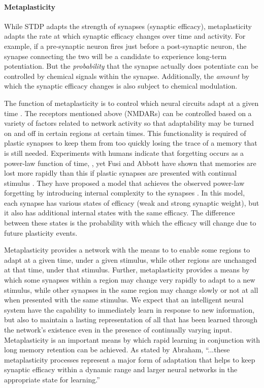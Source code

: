 \documentclass[twocolumn]{article}
\begin{document}
\paragraph{Metaplasticity}
While STDP adapts the strength of synapses (synaptic efficacy), metaplasticity adapts the rate at which synaptic efficacy changes over time and activity. For example, if a pre-synaptic neuron fires just before a post-synaptic neuron, the synapse connecting the two will be a candidate to experience long-term potentiation. But the \textit{probability} that the synapse actually does potentiate can be controlled by chemical signals within the synapse. Additionally, the \textit{amount} by which the synaptic efficacy changes is also subject to chemical modulation. 

The function of metaplasticity is to control which neural circuits adapt at a given time \cite{ab2008}. The receptors mentioned above (NMDARs) can be controlled based on a variety of factors related to network activity so that adaptability may be turned on and off in certain regions at certain times. This functionality is required of plastic synapses to keep them from too quickly losing the trace of a memory that is still needed. Experiments with humans indicate that forgetting occurs as a power-law function of time, \cite{wieb1991,wieb1997}, yet Fusi and Abbott have shown that memories are lost more rapidly than this if plastic synapses are presented with continual stimulus \cite{fuab2007}. They have proposed a model that achieves the observed power-law forgetting by introducing internal complexity to the synapses \cite{fudr2005}. In this model, each synapse has various states of efficacy (weak and strong synaptic weight), but it also has additional internal states with the same efficacy. The difference between these states is the probability with which the efficacy will change due to future plasticity events. 

Metaplasticity provides a network with the means to to enable some regions to adapt at a given time, under a given stimulus, while other regions are unchanged at that time, under that stimulus. Further, metaplasticity provides a means by which some synapses within a region may change very rapidly to adapt to a new stimulus, while other synapses in the same region may change slowly or not at all when presented with the same stimulus. We expect that an intelligent neural system have the capability to immediately learn in response to new information, but also to maintain a lasting representation of all that has been learned through the network's existence even in the presence of continually varying input. Metaplasticity is an important means by which rapid learning in conjunction with long memory retention can be achieved. As stated by Abraham, ``...these metaplasticity processes represent a major form of adaptation that helps to keep synaptic efficacy within a dynamic range and larger neural networks in the appropriate state for learning.''
\end{document}
